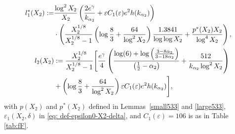 \documentclass[12pt]{amsart}
\begin{document}
\begin{theorem}
\begin{align}
l_1^*(X_2):=&\frac{\log^2 X_2}{X_2}  \left(\frac{ 2e^{\gamma}}{k_{\alpha_2}}
+\varepsilon C_1(\varepsilon) e^2 h(k_{\alpha_2})\right) \notag\\ & \cdot \left(\frac{X_2^{1/8}}{X_2^{1/8}-1}\left(\log \frac{8}{3}+\frac{64}{\log^2X_2}\right)\frac{1.3841}{\log \log X_2} +\frac{p^*(X_2)X_2}{\log^4X_2}\right),\label{ell1stareq}\\
l_2(X_2)&:=\frac{X_2^{1/8}}{X_2^{1/8}-1} 
\Bigg[\frac{e^{\gamma}}{4}\left(\frac{\log(6)+\log\left(\frac{3-8\alpha_2}{3-18\alpha_2}\right)}{\left(\frac{1}{2}-\alpha_2\right) }+\frac{512}{k_{\alpha_2}\log^2X_2}\right)\notag\\& +\left(\log \frac{8}{3}+\frac{64}{\log^2X_2}\right)\varepsilon C_1(\varepsilon) e^2 h(k_{\alpha_2}) \Bigg],\label{ell2eq}
\end{align}
with $p(X_2)$ and $p^*(X_2)$ defined in Lemmas~\ref{small533} and \ref{large533}, $\varepsilon_1(X_2,\delta)$ in \eqref{eq: def-epsilon0-X2-delta}, and $C_1(\varepsilon)=106$ is as in Table \ref{tab:fF}.
\end{theorem}
\end{document}
